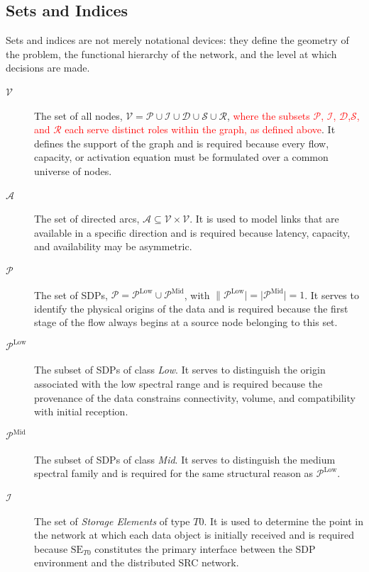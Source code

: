 \documentclass[a4paper,fleqn]{cas-dc}
\newcommand{\V}{\mathcal{V}}
\newcommand{\A}{\mathcal{A}}
\newcommand{\Pset}{\mathcal{P}}
\newcommand{\PL}{\mathcal{P}^{\mathrm{Low}}}
\newcommand{\PM}{\mathcal{P}^{\mathrm{Mid}}}
\newcommand{\Iset}{\mathcal{I}}
\newcommand{\Dset}{\mathcal{D}}
\newcommand{\Sset}{\mathcal{S}}
\newcommand{\Rset}{\mathcal{R}}
\begin{document}
\subsection{Sets and Indices}

Sets and indices are not merely notational devices: they define the geometry of the problem, the functional hierarchy of the network, and the level at which decisions are made.

\begin{description} 

\item[\(\V\)] The set of all nodes, \(\V = \Pset \cup \Iset \cup \Dset \cup \Sset \cup \Rset\), \textcolor{red}{where the subsets \(\Pset\), \(\Iset\), \(\Dset\),\(\Sset\), and \(\Rset\) each serve distinct roles within the graph, as defined above}. It defines the support of the graph and is required because every flow, capacity, or activation equation must be formulated over a common universe of nodes. 

\item[\(\A\)] The set of directed arcs, \(\A \subseteq \V\times\V\). It is used to model links that are available in a specific direction and is required because latency, capacity, and availability may be asymmetric. 

\item[\(\Pset\)] The set of SDPs, \(\Pset = \PL \cup \PM\), with \(\|\PL|=|\PM|=1\). It serves to identify the physical origins of the data and is required because the first stage of the flow always begins at a source node belonging to this set. 

\item[\(\PL\)] The subset of SDPs of class \emph{Low}. It serves to distinguish the origin associated with the low spectral range and is required because the provenance of the data constrains connectivity, volume, and compatibility with initial reception. 

\item[\(\PM\)] The subset of SDPs of class \emph{Mid}. It serves to distinguish the medium spectral family and is required for the same structural reason as \(\PL\). 

\item[\(\Iset\)] The set of \emph{Storage Elements} of type \(T0\). It is used to determine the point in the network at which each data object is initially received and is required because \(\mathrm{SE}_{T0}\) constitutes the primary interface between the SDP environment and the distributed SRC network. 


\end{description}
\end{document}
